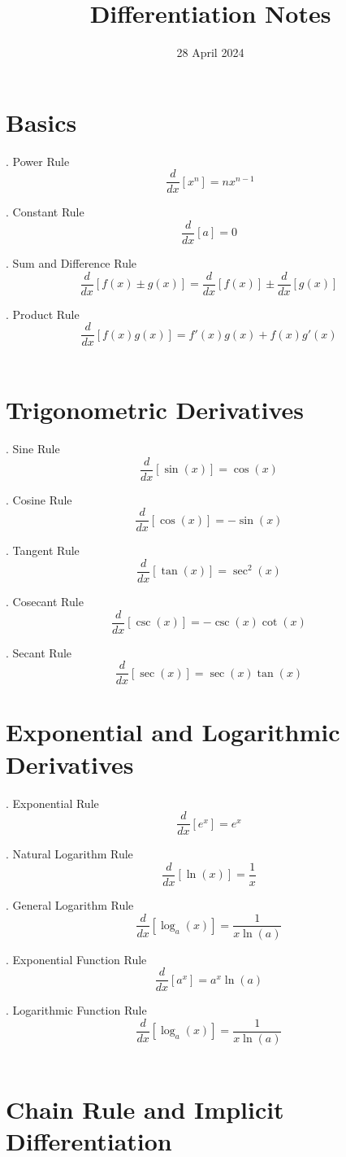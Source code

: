 \documentclass{article}
\title{Differentiation Notes}
\date{28 April 2024}
\begin{document}
\maketitle
\break

\section{Basics} \hfill \break

. Power Rule
$$ \frac{d}{dx}[x^n] = nx^{n-1}$$

. Constant Rule
 $$ \frac{d}{dx}[a] = 0 \ $$

. Sum and Difference Rule
$$ \frac{d}{dx}[f(x) \pm g(x)] = \frac{d}{dx}[f(x)] \pm \frac{d}{dx}[g(x)] \ $$

. Product Rule
$$  \frac{d}{dx}[f(x)g(x)] = f'(x)g(x) + f(x)g'(x) \ $$ \\

\section{Trigonometric Derivatives} \hfill \break

. Sine Rule
$$  \frac{d}{dx}[\sin(x)] = \cos(x) \ $$

. Cosine Rule
 $$ \frac{d}{dx}[\cos(x)] = -\sin(x) \ $$

. Tangent Rule
$$ \frac{d}{dx}[\tan(x)] = \sec^2(x) \ $$

. Cosecant Rule
$$   \frac{d}{dx}[\csc(x)] = -\csc(x) \cot(x) \ $$

. Secant Rule
$$ \frac{d}{dx}[\sec(x)] = \sec(x) \tan(x) \ $$

\break



\section{Exponential and Logarithmic Derivatives} \hfill \break

. Exponential Rule
$$ \frac{d}{dx}[e^x] = e^x \ $$

. Natural Logarithm Rule
 $$  \frac{d}{dx}[\ln(x)] = \frac{1}{x} \ $$

. General Logarithm Rule
$$  \frac{d}{dx}[\log_a(x)] = \frac{1}{x \ln(a)} \ $$

. Exponential Function Rule
$$  \frac{d}{dx}[a^x] = a^x \ln(a) \ $$

. Logarithmic Function Rule
$$  \frac{d}{dx}[\log_a(x)] = \frac{1}{x \ln(a)} \ $$ \\


\section{Chain Rule and Implicit Differentiation} \hfill \break


\break
\end{document}
